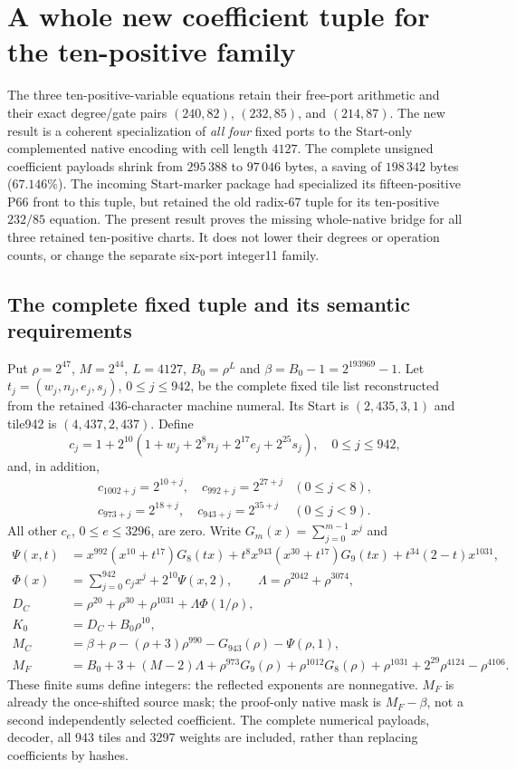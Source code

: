 \section{A whole new coefficient tuple for the ten-positive family}
\label{sec:start4127-positive10}
The three ten-positive-variable equations retain their free-port arithmetic
and their exact degree/gate pairs $(240,82)$, $(232,85)$, and $(214,87)$.
The new result is a coherent specialization of \emph{all four} fixed ports to
the Start-only complemented native encoding with cell length $4127$.
The complete unsigned coefficient payloads shrink from $295\,388$ to
$97\,046$ bytes, a saving of $198\,342$ bytes ($67.146\%$).
The incoming Start-marker package had specialized its fifteen-positive P66
front to this tuple, but retained the old radix-$67$ tuple for its ten-positive
$232/85$ equation. The present result proves the missing whole-native bridge
for all three retained ten-positive charts. It does not lower their degrees
or operation counts, or change the separate six-port integer11 family.

\subsection{The complete fixed tuple and its semantic requirements}
Put $\rho=2^{47}$, $M=2^{44}$, $L=4127$, $B_0=\rho^L$ and
$\beta=B_0-1=2^{193969}-1$. Let $t_j=(w_j,n_j,e_j,s_j)$, $0\leq j\leq942$,
be the complete fixed tile list reconstructed from the retained 436-character
machine numeral. Its Start is $(2,435,3,1)$ and tile942 is $(4,437,2,437)$.
Define
\[
 c_j=1+2^{10}(1+w_j+2^8n_j+2^{17}e_j+2^{25}s_j),
 \quad 0\leq j\leq942,
\]
and, in addition,
\[
\begin{array}{ll}
c_{1002+j}=2^{10+j},\quad c_{992+j}=2^{27+j}&(0\leq j<8),\\
c_{973+j}=2^{18+j},\quad c_{943+j}=2^{35+j}&(0\leq j<9).
\end{array}
\]
All other $c_e$, $0\leq e\leq3296$, are zero. Write
$G_m(x)=\sum_{j=0}^{m-1}x^j$ and
\begin{align*}
\Psi(x,t)&=x^{992}(x^{10}+t^{17})G_8(tx)
 +t^8x^{943}(x^{30}+t^{17})G_9(tx)+t^{34}(2-t)x^{1031},\\
\Phi(x)&=\sum_{j=0}^{942}c_jx^j+2^{10}\Psi(x,2),\qquad
\Lambda=\rho^{2042}+\rho^{3074},\\
D_C&=\rho^{20}+\rho^{30}+\rho^{1031}+\Lambda\Phi(1/\rho),\\
K_0&=D_C+B_0\rho^{10},\\
M_C&=\beta+\rho-(\rho+3)\rho^{990}-G_{943}(\rho)-\Psi(\rho,1),\\
M_F&=B_0+3+(M-2)\Lambda+\rho^{973}G_9(\rho)
 +\rho^{1012}G_8(\rho)+\rho^{1031}
 +2^{29}\rho^{4124}-\rho^{4106}.
\end{align*}
These finite sums define integers: the reflected exponents are nonnegative.
$M_F$ is already the once-shifted source mask; the proof-only native mask is
$M_F-\beta$, not a second independently selected coefficient.
The complete numerical payloads, decoder, all 943 tiles and 3297 weights are
included, rather than replacing coefficients by hashes.

